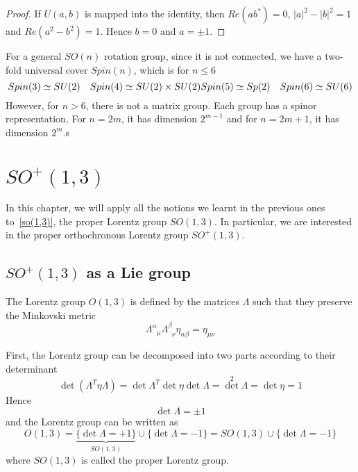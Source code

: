     \begin{proof}
        If $U(a,b)$ is mapped into the identity, then $Re(a b^*) = 0$, $|a|^2 - |b|^2 = 1$ and $Re(a^2 - b^2) = 1$. Hence $b=0$ and $a = \pm 1$. 
    \end{proof}

    For a general $SO(n)$ rotation group, since it is not connected, we have a two-fold universal cover $Spin(n)$, which is for $n \leq 6$
    \begin{equation*}
        Spin(3) \simeq SU(2) \quad Spin(4) \simeq SU(2) \times SU(2) \\
        Spin(5) \simeq Sp(2) \quad Spin(6) \simeq SU(6)
    \end{equation*}
    However, for $n > 6$, there is not a matrix group. Each group has a spinor representation. For $n = 2m$, it has dimension $2^{m-1}$ and for $n = 2m + 1$, it has dimension $2^m$.s

\chapter{$SO^+(1,3)$}

    In this chapter, we will apply all the notions we learnt in the previous ones to~\eqref{so(1,3)}, the proper Lorentz group $SO(1,3)$. In particular, we are interested in the proper orthochronous Lorentz group $SO^+(1,3)$.

\section{$SO^+(1,3)$ as a Lie group}

    The Lorentz group $O(1,3)$ is defined by the matrices $\Lambda$ such that they preserve the Minkovski metric 
    \begin{equation}\label{lorentz}
        \Lambda^\alpha_{\phantom \alpha \mu} \Lambda^\beta_{\phantom \beta \nu} \eta_{\alpha \beta} = \eta_{\mu \nu}
    \end{equation}

    First, the Lorentz group can be decomposed into two parts according to their determinant
    \begin{equation*}
        \det (\Lambda^T \eta \Lambda) = \det \Lambda^T \det \eta \det \Lambda = \det^2 \Lambda = \det \eta = 1
    \end{equation*}
    Hence 
    \begin{equation*}
        \det \Lambda = \pm 1
    \end{equation*}
    and the Lorentz group can be written as
    \begin{equation*}
        O(1,3) = \underbrace{\{\det \Lambda = +1\}}_{SO(1,3)} \cup \{\det \Lambda = - 1\} = SO(1,3) \cup \{\det \Lambda = - 1\}
    \end{equation*}
    where $SO(1,3)$ is called the proper Lorentz group.

